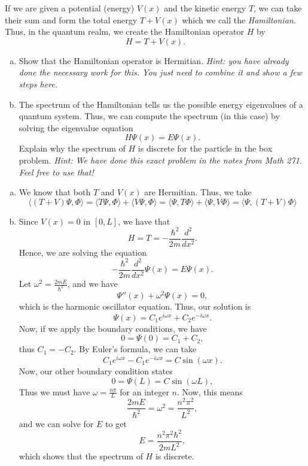 \documentclass[12pt]{article} %
\newcommand{\innprod}[2]{\langle #1, #2 \rangle}
\begin{document}
\newpage
\begin{problem}
If we are given a potential (energy) $V(x)$ and the kinetic energy $T$, we can take their sum and form the total energy $T+V(x)$ which we call the \emph{Hamiltonian}.  Thus, in the quantum realm, we create the Hamiltonian operator $H$ by
\[
H=T+V(x).
\]
\begin{enumerate}[(a)]
	\item Show that the Hamiltonian operator is Hermitian. \emph{Hint: you have already done the necessary work for this. You just need to combine it and show a few steps here.}
	\item The spectrum of the Hamiltonian tells us the possible energy eigenvalues of a quantum system. Thus, we can compute the spectrum (in this case) by solving the eigenvalue equation
	\[
	H\Psi(x)=E\Psi(x).
	\]
    Explain why the spectrum of $H$ is discrete for the particle in the box problem. \emph{Hint: We have done this exact problem in the notes from Math 271. Feel free to use that!}
\end{enumerate}
\end{problem}
\begin{solution}
	\begin{enumerate}[(a)]
		\item We know that both $T$ and $V(x)$ are Hermitian.  Thus, we take
		\[
		\innprod{(T+V)\Psi}{\Phi} = \innprod{T\Psi}{\Phi}+\innprod{V\Psi}{\Phi} = \innprod{\Psi}{T\Phi}+\innprod{\Psi}{V\Phi} = \innprod{\Psi}{(T+V)\Phi}
		\]
		\item Since $V(x)=0$ in $[0,L]$, we have that
		\[
		H = T = -\frac{\hbar^2}{2m} \frac{d^2}{dx^2}.
		\]
		Hence, we are solving the equation
		\[
		-\frac{\hbar^2}{2m} \frac{d^2}{dx^2}\Psi(x) = E \Psi(x).
		\]
		Let $\omega^2 = \frac{2mE}{\hbar^2}$, and we have
		\[
		\Psi''(x) +\omega^2 \Psi(x) = 0,
		\]
		which is the harmonic oscillator equation.  Thus, our solution is
		\[
		\Psi(x) = C_1 e^{i\omega x}+C_2 e^{-i\omega x}.
		\]
		Now, if we apply the boundary conditions, we have
		\[
		0=\Psi(0)= C_1+C_2,
		\]
		thus $C_1=-C_2$. By Euler's formula, we can take
		\[
		C_1 e^{i\omega x}-C_1 e^{-i \omega x} = C \sin(\omega x).
		\]
		Now, our other boundary condition states
		\[
		0 = \Psi(L) = C\sin(\omega L),
		\]
		Thus we must have $\omega = \frac{n\pi}{L}$ for an integer $n$. Now, this means
		\[
		\frac{2mE}{\hbar^2}=\omega^2 = \frac{n^2\pi^2}{L^2},
		\]
		and we can solve for $E$ to get
		\[
		\boxed{E = \frac{n^2\pi^2\hbar^2}{2mL^2},}
		\]		
		which shows that the spectrum of $H$ is discrete.
	\end{enumerate}
\end{solution}
\end{document}
